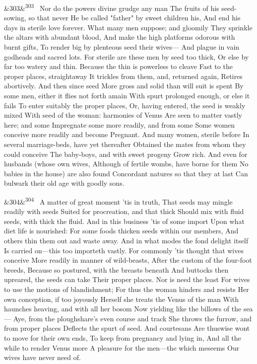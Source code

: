 \documentclass[12pt]{article}
\newcommand{\para}[1][]{\par\noindent\ifx&#1&\else\textsuperscript{\footnotesize #1}~\fi}
\begin{document}
\para[303] Nor do the powers divine grudge any man The fruits of his seed-sowing, so that never He be called "father" by sweet children his, And end his days in sterile love forever. What many men suppose; and gloomily They sprinkle the altars with abundant blood, And make the high platforms odorous with burnt gifts, To render big by plenteous seed their wives--- And plague in vain godheads and sacred lots. For sterile are these men by seed too thick, Or else by far too watery and thin. Because the thin is powerless to cleave Fast to the proper places, straightaway It trickles from them, and, returned again, Retires abortively. And then since seed More gross and solid than will suit is spent By some men, either it flies not forth amain With spurt prolonged enough, or else it fails To enter suitably the proper places, Or, having entered, the seed is weakly mixed With seed of the woman: harmonies of Venus Are seen to matter vastly here; and some Impregnate some more readily, and from some Some women conceive more readily and become Pregnant. And many women, sterile before In several marriage-beds, have yet thereafter Obtained the mates from whom they could conceive The baby-boys, and with sweet progeny Grow rich. And even for husbands (whose own wives, Although of fertile wombs, have borne for them No babies in the house) are also found Concordant natures so that they at last Can bulwark their old age with goodly sons.

\para[304] A matter of great moment 'tis in truth, That seeds may mingle readily with seeds Suited for procreation, and that thick Should mix with fluid seeds, with thick the fluid. And in this business 'tis of some import Upon what diet life is nourished: For some foods thicken seeds within our members, And others thin them out and waste away. And in what modes the fond delight itself Is carried on---this too importeth vastly. For commonly 'tis thought that wives conceive More readily in manner of wild-beasts, After the custom of the four-foot breeds, Because so postured, with the breasts beneath And buttocks then upreared, the seeds can take Their proper places. Nor is need the least For wives to use the motions of blandishment; For thus the woman hinders and resists Her own conception, if too joyously Herself she treats the Venus of the man With haunches heaving, and with all her bosom Now yielding like the billows of the sea--- Aye, from the ploughshare's even course and track She throws the furrow, and from proper places Deflects the spurt of seed. And courtesans Are thuswise wont to move for their own ends, To keep from pregnancy and lying in, And all the while to render Venus more A pleasure for the men---the which meseems Our wives have never need of.
\end{document}
